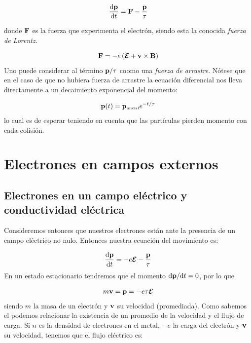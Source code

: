 \begin{mybox}
\begin{equation}
	\frac{\mathrm{d} \mathbf{p}}{\mathrm{d} t} = \mathbf{F} - \frac{\mathbf{p}}{\tau}
\end{equation}
\end{mybox}
donde $\mathbf{F}$ es la fuerza que experimenta el electrón, siendo esta la conocida \textit{fuerza de Lorentz}. 

\begin{equation}
	\mathbf{F} = - e \left( \boldsymbol{\mathcal{E}} + \mathbf{v} \times \mathbf{B} \right)
\end{equation}
Uno puede considerar al término $\mathbf{p}/\tau$ coomo una \textit{fuerza de arrastre}. Nótese que en el caso de que no hubiera fuerza de arrastre la ecuación diferencial nos lleva directamente a un decaimiento exponencial del momento:

\begin{equation}
	\mathbf{p} (t) = \mathbf{p}_{\text{{\tiny inicial}}} e^{-t/\tau}
\end{equation}
lo cual es de esperar teniendo en cuenta que las partículas pierden momento con cada colisión.



\section{Electrones en campos externos}

\subsection{Electrones en un campo eléctrico y conductividad eléctrica}

Consideremos entonces que nuestros electrones están ante la presencia de un campo eléctrico no nulo. Entonces nuestra ecuación del movimiento es:

\begin{equation}
	\frac{\mathrm{d} \mathbf{p}}{\mathrm{d} t} = -e \boldsymbol{\mathcal{E}} - \frac{\mathbf{p}}{\tau}
\end{equation}
En un estado estacionario tendremos que el momento $\mathrm{d} \mathbf{p} / \mathrm{d} t = 0$, por lo que

\begin{equation}
	m \mathbf{v} = \mathbf{p} = - e \tau \boldsymbol{\mathcal{E}}
\end{equation}
siendo $m$ la masa de un electrón y $\mathbf{v}$ su velocidad (promediada). Como sabemos el podemos relacionar la existencia de un promedio de la velocidad y el flujo de carga. Si $n$ es la densidad de electrones en el metal, $-e$ la carga del electrón y $\mathbf{v}$ su velocidad, tenemos que el flujo eléctrico es:

